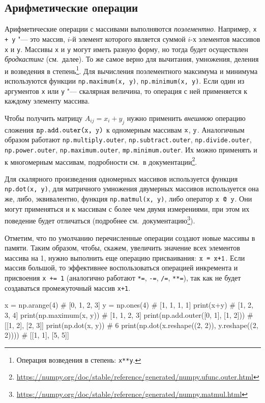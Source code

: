 \subsection{Арифметические операции}
Арифметические операции  с массивами выполняются \emph{поэлементно}.
Например, \verb"x + y" "--- это массив, $i$-й элемент которого является суммой $i$-х элементов массивов \verb"x" и \verb"y". Массивы \verb"x" и \verb"y" могут иметь разную форму, но тогда будет осуществлен \emph{бродкастинг} (см.~далее).
То же самое верно для вычитания, умножения, деления и возведения в степень\footnote{Операция возведения в степень: \verb"x**y".}.
Для вычисления поэлементного максимума и минимума используются функции \verb"np.maximum(x, y)", \verb"np.minimum(x, y)".
Если один из аргументов \verb"x" или \verb"y" "--- скалярная величина, то операция с ней применяется к каждому элементу массива.

Чтобы получить матрицу $A_{ij} = x_i+y_j$ нужно применить \emph{внешнюю} операцию сложения $\verb"np.add.outer(x, y)"$ к одномерным массивам $\verb"x"$, $\verb"y"$.
Аналогичным образом работают \verb"np.multiply.outer", \verb"np.subtract.outer", \verb"np.divide.outer", \verb"np.power.outer", \verb"np.maximum.outer", \verb"mp.minimum.outer".
Их можно применять и к многомерным массивам, подробности см.~в документации\footnote{\url{https://numpy.org/doc/stable/reference/generated/numpy.ufunc.outer.html}}. 

Для скалярного произведения одномерных массивов используется функция \verb"np.dot(x, y)", для матричного умножения двумерных массивов используется она же, либо, эквивалентно, функция \verb"np.matmul(x, y)", либо оператор $\verb"x @ y"$.
Они могут применяться и к массивам с более чем двумя измерениями, при этом их поведение будет отличаться (подробнее см.~документацию\footnote{\url{https://numpy.org/doc/stable/reference/generated/numpy.matmul.html}}).

Отметим, что по умолчанию перечисленные операции создают новые массивы в памяти.
Таким образом, чтобы, скажем, увеличить значение всех элементов массива на 1, нужно выполнить еще операцию присваивания: $\verb"x = x+1"$.
Если массив большой, то эффективнее воспользоваться операцией инкремента и присвоения \verb"x += 1" (аналогично работают \verb"*=", \verb"-=", \verb"/=", \verb"**="), так как не будет создаваться промежуточный массив \verb"x+1".
\begin{python}
x = np.arange(4)                                     # [0, 1, 2, 3]
y = np.ones(4)                                       # [1, 1, 1, 1]
print(x+y)                                           # [1, 2, 3, 4]
print(np.maximum(x, y))                              # [1, 1, 2, 3]
print(np.add.outer([0, 1], [1, 2]))                  # [[1, 2], [2, 3]]
print(np.dot(x, y))                                  # 6
print(np.dot(x.reshape((2, 2)), y.reshape((2, 2))))  # [[1, 1], [5, 5]]
\end{python}


